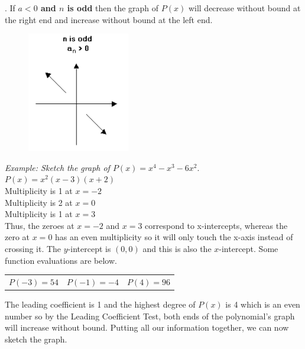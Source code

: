 \documentclass{article}
\begin{document}
    . If \textbf{$a<0$ and $n$ is odd} then the graph of $P(x)$ will decrease without
    bound at the right end and increase without bound at the left end. \\
    \begin{figure} [hbt!]
        \centering
        \includegraphics[scale = 0.5] {Resources/Unit4HigherPolynomials/leadcoeff4.png}
    \end{figure}


    \noindent \color{blue} \textit{Example: Sketch the graph of $P(x)=x^4-x^3-6x^2$}. \color{black} \\
    $P(x)=x^2(x-3)(x+2)$ \\
    Multiplicity is 1 at $x=-2$ \\
    Multiplicity is 2 at $x=0$ \\
    Multiplicity is 1 at $x=3$ \\

    \noindent Thus, the zeroes at $x=-2$ and $x=3$ correspond to x-intercepts, whereas the
    zero at $x=0$ has an even multiplicity so it will only touch the x-axis instead of
    crossing it. The $y$-intercept is $(0,0)$ and this is also the $x$-intercept.
    Some function evaluations are below. \\
    \begin{center}
        \begin{tabular}{ccc}
            $P(-3)=54$ & $P(-1)=-4$ & $P(4)=96$
        \end{tabular}
    \end{center}

    \noindent The leading coefficient is 1 and the highest degree of $P(x)$ is 4 which is
    an even number so by the Leading Coefficient Test, both ends of the polynomial's graph
    will increase without bound. Putting all our information together, we can now sketch
    the graph. \\

    \begin{center}
    \end{center}
\end{document}
